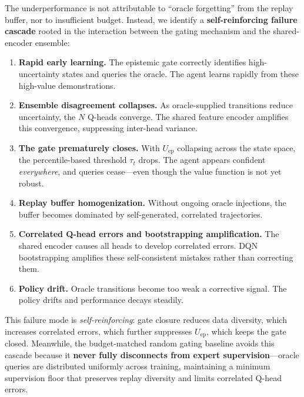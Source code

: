 \documentclass[11pt, a4paper]{article}
\begin{document}
The underperformance is not attributable to ``oracle forgetting'' from the replay buffer, nor to insufficient budget. Instead, we identify a \textbf{self-reinforcing failure cascade} rooted in the interaction between the gating mechanism and the shared-encoder ensemble:

\begin{enumerate}[leftmargin=*, label=\textbf{(\arabic*)}]
    \item \textbf{Rapid early learning.} The epistemic gate correctly identifies high-uncertainty states and queries the oracle. The agent learns rapidly from these high-value demonstrations.
    \item \textbf{Ensemble disagreement collapses.} As oracle-supplied transitions reduce uncertainty, the $N$ Q-heads converge. The shared feature encoder amplifies this convergence, suppressing inter-head variance.
    \item \textbf{The gate prematurely closes.} With $U_{\mathrm{ep}}$ collapsing across the state space, the percentile-based threshold $\tau_t$ drops. The agent appears confident \textit{everywhere}, and queries cease---even though the value function is not yet robust.
    \item \textbf{Replay buffer homogenization.} Without ongoing oracle injections, the buffer becomes dominated by self-generated, correlated trajectories.
    \item \textbf{Correlated Q-head errors and bootstrapping amplification.} The shared encoder causes all heads to develop correlated errors. DQN bootstrapping amplifies these self-consistent mistakes rather than correcting them.
    \item \textbf{Policy drift.} Oracle transitions become too weak a corrective signal. The policy drifts and performance decays steadily.
\end{enumerate}

This failure mode is \textit{self-reinforcing}: gate closure reduces data diversity, which increases correlated errors, which further suppresses $U_{\mathrm{ep}}$, which keeps the gate closed. Meanwhile, the budget-matched random gating baseline avoids this cascade because it \textbf{never fully disconnects from expert supervision}---oracle queries are distributed uniformly across training, maintaining a minimum supervision floor that preserves replay diversity and limits correlated Q-head errors.
\end{document}
